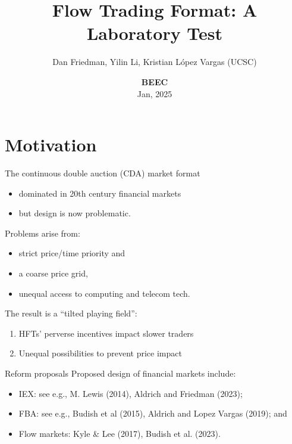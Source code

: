\documentclass[10pt]{beamer}
\title[FlowTrading]{Flow Trading Format: A Laboratory Test}
\author[DF-YL-KL]{Dan Friedman, Yilin Li, Kristian L\'opez Vargas (UCSC)}
\institute[UCSC]{}
\date[4/27/2024]{\vspace{1cm} \textbf{BEEC} \\
Jan, 2025}
\begin{document}
\maketitle


\section{Motivation}
\begin{frame}{
The continuous double auction (CDA) market format}
\begin{itemize}
\item dominated in 20th century financial markets 
\item but design is now problematic.  %
\end{itemize}
Problems arise from:
\begin{itemize}
\item strict price/time priority and 
\item a coarse price grid, 
\item unequal access to computing and telecom tech.

\end{itemize} %
The result is a ``tilted playing field'': 
\begin{enumerate}
\item HFTs' perverse incentives impact slower traders
\item Unequal possibilities to prevent price impact
   \end{enumerate}
\end{frame}

\begin{frame}{Reform proposals}
Proposed design of financial markets include:
    \begin{itemize}
\item IEX: see e.g., M. Lewis (2014), Aldrich and Friedman (2023); %
\item FBA: see e.g., Budish et al (2015), Aldrich and Lopez Vargas (2019); and %
\item Flow markets:  Kyle \& Lee (2017), Budish et al. (2023).
\end{itemize}
\end{frame}
\end{document}
